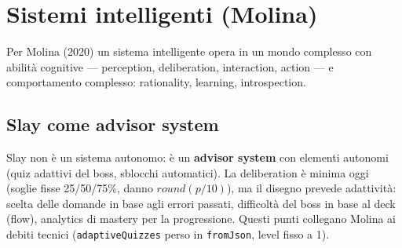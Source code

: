 \chapter{Sistemi intelligenti (Molina)}
\label{ch:molina}
Per Molina (2020) un sistema intelligente opera in un mondo complesso con
abilità cognitive --- perception, deliberation, interaction, action --- e
comportamento complesso: rationality, learning, introspection.

\section{Slay come advisor system}
Slay non è un sistema autonomo: è un \textbf{advisor system} con elementi
autonomi (quiz adattivi del boss, sblocchi automatici). La deliberation è
minima oggi (soglie fisse 25/50/75\%, danno $\mathit{round}(p/10)$), ma il
disegno prevede adattività: scelta delle domande in base agli errori passati,
difficoltà del boss in base al deck (flow), analytics di mastery per la
progressione. Questi punti collegano Molina ai debiti tecnici
(\texttt{adaptiveQuizzes} perso in \texttt{fromJson}, level fisso a 1).
